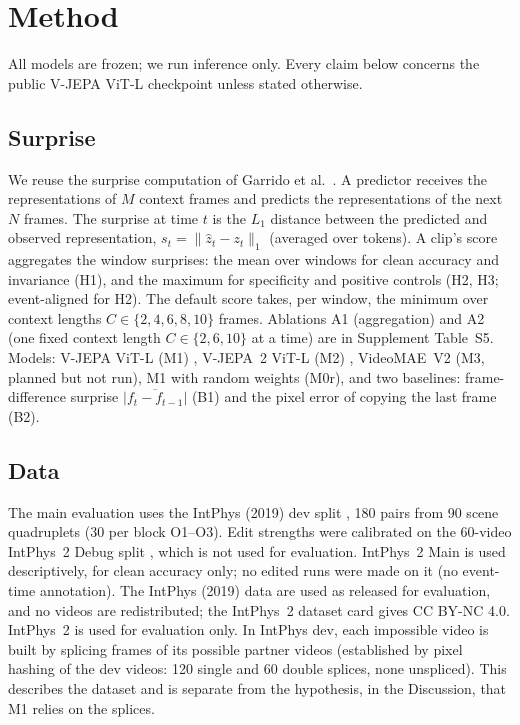 \section{Method}
\label{sec:method}
All models are frozen; we run inference only. Every claim below concerns the public V-JEPA ViT-L checkpoint unless stated otherwise.

\subsection{Surprise}
We reuse the surprise computation of Garrido et al.\ \cite{garrido2025}. A predictor receives the representations of $M$ context frames and predicts the representations of the next $N$ frames. The surprise at time $t$ is the $L_1$ distance between the predicted and observed representation, $s_t=\lVert \hat z_t - z_t\rVert_1$ (averaged over tokens). A clip's score aggregates the window surprises: the mean over windows for clean accuracy and invariance (H1), and the maximum for specificity and positive controls (H2, H3; event-aligned for H2). The default score takes, per window, the minimum over context lengths $C\in\{2,4,6,8,10\}$ frames. Ablations A1 (aggregation) and A2 (one fixed context length $C\in\{2,6,10\}$ at a time) are in Supplement Table~S5. Models: V-JEPA ViT-L (M1) \cite{garrido2025,bardes2024}, V-JEPA~2 ViT-L (M2) \cite{assran2025}, VideoMAE~V2 (M3, planned \cite{wang2023} but not run), M1 with random weights (M0r), and two baselines: frame-difference surprise $\overline{|f_t-f_{t-1}|}$ (B1) and the pixel error of copying the last frame (B2).

\subsection{Data}
The main evaluation uses the IntPhys (2019) dev split \cite{riochet2022}, 180 pairs from 90 scene quadruplets (30 per block O1--O3). Edit strengths were calibrated on the 60-video IntPhys~2 Debug split \cite{bordes2025}, which is not used for evaluation. IntPhys~2 Main is used descriptively, for clean accuracy only; no edited runs were made on it (no event-time annotation). The IntPhys (2019) data are used as released for evaluation, and no videos are redistributed; the IntPhys~2 dataset card gives CC BY-NC 4.0. IntPhys~2 is used for evaluation only. In IntPhys dev, each impossible video is built by splicing frames of its possible partner videos (established by pixel hashing of the dev videos: 120 single and 60 double splices, none unspliced). This describes the dataset and is separate from the hypothesis, in the Discussion, that M1 relies on the splices.

